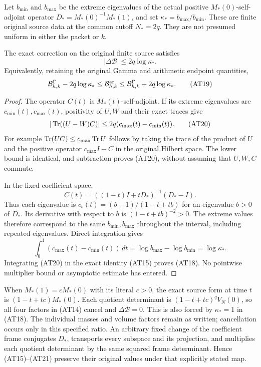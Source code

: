 Let $b_{\min}$ and $b_{\max}$ be the extreme eigenvalues of the
actual positive $M_*(0)$-self-adjoint operator
$D_*=M_*(0)^{-1}M_*(1)$, and set
$\kappa_*=b_{\max}/b_{\min}$. These are finite original source
data at the common cutoff $N_*=2q$. They are not presumed
uniform in either the packet or $k$.

\begin{theorem}
The exact correction on the original finite source satisfies
\[
 \boxed{|\Delta\mathcal B|\le2q\log\kappa_* .}             \tag{AT18}
\]
Equivalently, retaining the original Gamma and arithmetic endpoint
quantities,
\[
 \mathcal B^\Gamma_{h,k}-2q\log\kappa_*
 \le\mathcal B^{\mathrm{ar}}_{h,k}
 \le\mathcal B^\Gamma_{h,k}+2q\log\kappa_* .                \tag{AT19}
\]
\end{theorem}
\begin{proof}
The operator $C(t)$ is $M_*(t)$-self-adjoint. If its extreme
eigenvalues are $c_{\min}(t),c_{\max}(t)$, positivity of $U,W$
and their exact traces give
\[
 |\operatorname{Tr}((U-W)C)|\le2q(c_{\max}(t)-c_{\min}(t)).             \tag{AT20}
\]
For example $\operatorname{Tr}(UC)\le c_{\max}\operatorname{Tr} U$ follows by taking
the trace of the product of $U$ and the positive operator
$c_{\max}I-C$ in the original Hilbert space. The lower bound
is identical, and subtraction proves (AT20), without assuming
that $U,W,C$ commute.

In the fixed coefficient space,
\[
 C(t)=((1-t)I+tD_*)^{-1}(D_*-I).
\]
Thus each eigenvalue is
$c_b(t)=(b-1)/(1-t+tb)$ for an eigenvalue $b>0$ of $D_*$.
Its derivative with respect to $b$ is $(1-t+tb)^{-2}>0$.
The extreme values therefore correspond to the same
$b_{\min},b_{\max}$ throughout the interval, including repeated
eigenvalues. Direct integration gives
\[
 \int_0^1(c_{\max}(t)-c_{\min}(t))\,dt
 =\log b_{\max}-\log b_{\min}=\log\kappa_* .             \tag{AT21}
\]
Integrating (AT20) in the exact identity (AT15) proves (AT18).
No pointwise multiplier bound or asymptotic estimate has entered.
\end{proof}

When $M_*(1)=cM_*(0)$ with its literal $c>0$, the exact source
form at time $t$ is $(1-t+tc)M_*(0)$. Each quotient determinant
is $(1-t+tc)^qV_N(0)$, so all four factors in (AT14) cancel
and $\Delta\mathcal B=0$. This is also forced by
$\kappa_*=1$ in (AT18). The individual masses and volume
factors remain as written; cancellation occurs only in this
specified ratio. An arbitrary fixed change of the coefficient
frame conjugates $D_*$, transports every subspace and its
projection, and multiplies each quotient determinant by the
same squared frame determinant. Hence (AT15)--(AT21) preserve
their original values under that explicitly stated map.

